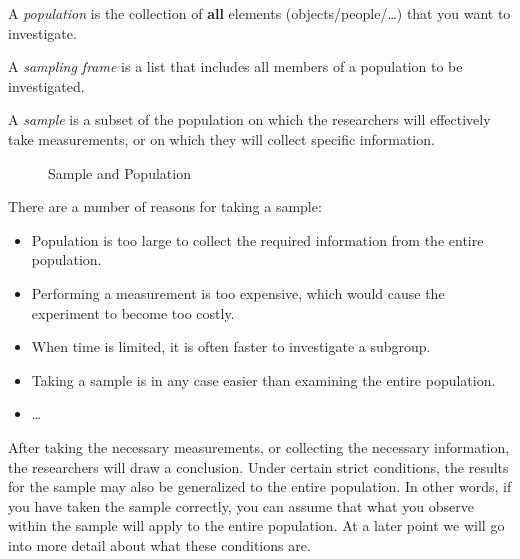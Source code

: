\begin{definition}[Population]
    A \emph{population} is the collection of \textbf{all} elements (objects/people/\ldots) that you want to investigate.
\end{definition}

\begin{definition}
    A \emph{sampling frame} is a list that includes all members of a population to be investigated.
\end{definition}

\begin{definition}[Sample]
    A \emph{sample} is a subset of the population on which the researchers will effectively take measurements, or on which they will collect specific information.
\end{definition}

\begin{figure}
    \begin{center}
    \end{center}
    \caption{Sample and Population}
    \label{img:populatie-steekproef}
\end{figure}

There are a number of reasons for taking a sample:

\begin{itemize}
    \item Population is too large to collect the required information from the entire population.
    \item Performing a measurement is too expensive, which would cause the experiment to become too costly.
    \item When time is limited, it is often faster to investigate a subgroup.
    \item Taking a sample is in any case easier than examining the entire population.
    \item \dots
\end{itemize}

After taking the necessary measurements, or collecting the necessary information, the researchers will draw a conclusion. Under certain strict conditions, the results for the sample may also be generalized to the entire population. In other words, if you have taken the sample correctly, you can assume that what you observe within the sample will apply to the entire population. At a later point we will go into more detail about what these conditions are.

